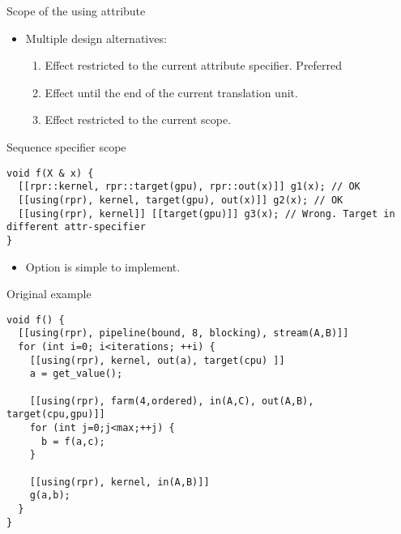 \begin{frame}[t]{Scope of the using attribute}
\begin{itemize}
  \item Multiple design alternatives:
    \begin{enumerate}[1.]
      \item Effect restricted to the current attribute specifier. \alert{Preferred}
      \item Effect until the end of the current translation unit.
      \item Effect restricted to the current scope.
    \end{enumerate}
\end{itemize}
\end{frame}

\begin{frame}[t,fragile]{Sequence specifier scope}
\begin{lstlisting}
void f(X & x) {
  [[rpr::kernel, rpr::target(gpu), rpr::out(x)]] g1(x); // OK
  [[using(rpr), kernel, target(gpu), out(x)]] g2(x); // OK
  [[using(rpr), kernel]] [[target(gpu)]] g3(x); // Wrong. Target in different attr-specifier
}
\end{lstlisting}

\begin{itemize}
  \item Option is simple to implement.
\end{itemize}
\end{frame}

\begin{frame}[t,fragile]{Original example}
\begin{lstlisting}
void f() {
  [[using(rpr), pipeline(bound, 8, blocking), stream(A,B)]]
  for (int i=0; i<iterations; ++i) {
    [[using(rpr), kernel, out(a), target(cpu) ]]
    a = get_value();
    
    [[using(rpr), farm(4,ordered), in(A,C), out(A,B), target(cpu,gpu)]]
    for (int j=0;j<max;++j) {
      b = f(a,c);
    }

    [[using(rpr), kernel, in(A,B)]]
    g(a,b);
  }
}
\end{lstlisting}
\end{frame}
